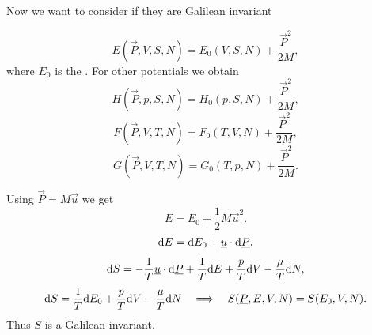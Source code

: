 \documentclass[../main.tex]{subfiles}
\begin{document}
    Now we want to consider if they are Galilean invariant


    \begin{displaymath}
      E(\vec P, V, S, N) = E_0 (V, S, N) + \frac{\vec P^2}{2 M},
    \end{displaymath}
    where $E_0$ is the .
    For other potentials we obtain
    \begin{displaymath}
      H(\vec P, p , S, N) = H_0(p, S, N) + \frac{\vec P^2}{2 M},
    \end{displaymath}
    \begin{displaymath}
      F(\vec P, V, T, N) = F_0(T, V, N) + \frac{\vec P^2}{2 M},
    \end{displaymath}
    \begin{displaymath}
      G(\vec P, V, T, N) = G_0(T, p, N) + \frac{\vec P^2}{2 M}.
    \end{displaymath}
    
    Using $\vec P = M \vec u$ we get
    \begin{displaymath}
      E = E_0 + \frac{1}{2} M \vec u ^2.
    \end{displaymath}
    \begin{displaymath}
      \mathrm{d} E = \mathrm{d} E_0 + \underline{u} \cdot \mathrm{d} \underline{P},
    \end{displaymath}
    \begin{displaymath}
      \mathrm{d} S = - \frac{1}{T} \underline{u} \cdot \mathrm{d} \underline{P} + \frac{1}{T} \mathrm{d} E + \frac{p}{T} \mathrm{d} V - \frac{\mu}{T} \mathrm{d} N,
    \end{displaymath}
    \begin{displaymath}
      \mathrm{d} S = \frac{1}{T}\mathrm{d} E_0 + \frac{p}{T} \mathrm{d} V - \frac{\mu}{T} \mathrm{d} N 
      \quad \Longrightarrow \quad S(\underline{P} , E , V, N) = S(E_0, V, N).
    \end{displaymath}
    Thus $S$ is a Galilean invariant.
\end{document}
